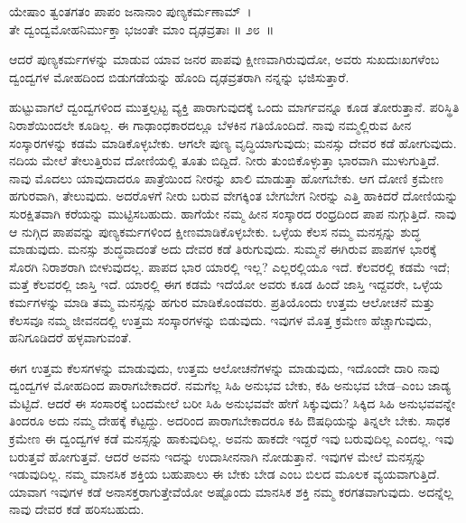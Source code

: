 \begin{shloka}
ಯೇಷಾಂ ತ್ವಂತಗತಂ ಪಾಪಂ ಜನಾನಾಂ ಪುಣ್ಯಕರ್ಮಣಾಮ್~।\\ತೇ ದ್ವಂದ್ವಮೋಹನಿರ್ಮುಕ್ತಾ ಭಜಂತೇ ಮಾಂ ದೃಢವ್ರತಾಃ \hfill॥ ೨೮~॥
\end{shloka}

\begin{artha}
ಆದರೆ ಪುಣ್ಯಕರ್ಮಗಳನ್ನು ಮಾಡುವ ಯಾವ ಜನರ ಪಾಪವು ಕ್ಷೀಣವಾಗಿರುವುದೋ, ಅವರು ಸುಖದುಃಖಗಳೆಂಬ ದ್ವಂದ್ವಗಳ ಮೋಹದಿಂದ ಬಿಡುಗಡೆಯನ್ನು ಹೊಂದಿ ದೃಢವ್ರತರಾಗಿ ನನ್ನನ್ನು ಭಜಿಸುತ್ತಾರೆ.
\end{artha}

ಹುಟ್ಟುವಾಗಲೆ ದ್ವಂದ್ವಗಳಿಂದ ಮುತ್ತಲ್ಪಟ್ಟ ವ್ಯಕ್ತಿ ಪಾರಾಗುವುದಕ್ಕೆ ಒಂದು ಮಾರ್ಗವನ್ನೂ ಕೂಡ ತೋರುತ್ತಾನೆ. ಪರಿಸ್ಥಿತಿ ನಿರಾಶೆಯಿಂದಲೇ ಕೂಡಿಲ್ಲ. ಈ ಗಾಢಾಂಧಕಾರದಲ್ಲೂ ಬೆಳಕಿನ ಗತಿಯೊಂದಿದೆ. ನಾವು ನಮ್ಮಲ್ಲಿರುವ ಹೀನ ಸಂಸ್ಕಾರಗಳನ್ನು ಕಡಮೆ ಮಾಡಿಕೊಳ್ಳಬೇಕು. ಆಗಲೇ ಪುಣ್ಯ ವೃದ್ಧಿಯಾಗುವುದು; ಮನಸ್ಸು ದೇವರ ಕಡೆ ಹೋಗುವುದು. ನದಿಯ ಮೇಲೆ ತೇಲುತ್ತಿರುವ ದೋಣಿಯಲ್ಲಿ ತೂತು ಬಿದ್ದಿದೆ. ನೀರು ತುಂಬಿಕೊಳ್ಳುತ್ತಾ ಭಾರವಾಗಿ ಮುಳುಗುತ್ತಿದೆ. ನಾವು ಮೊದಲು ಯಾವುದಾದರೂ ಪಾತ್ರೆಯಿಂದ ನೀರನ್ನು ಖಾಲಿ ಮಾಡುತ್ತಾ ಹೋಗಬೇಕು. ಆಗ ದೋಣಿ ಕ್ರಮೇಣ ಹಗುರವಾಗಿ, ತೇಲುವುದು. ಅದರೊಳಗೆ ನೀರು ಬರುವ ವೇಗಕ್ಕಿಂತ ಬೇಗಬೇಗ ನೀರನ್ನು ಎತ್ತಿ ಹಾಕಿದರೆ ದೋಣಿಯನ್ನು ಸುರಕ್ಷಿತವಾಗಿ ಕರೆಯನ್ನು ಮುಟ್ಟಿಸಬಹುದು. ಹಾಗೆಯೇ ನಮ್ಮ ಹೀನ ಸಂಸ್ಕಾರದ ರಂಧ್ರದಿಂದ ಪಾಪ ನುಗ್ಗುತ್ತಿದೆ. ನಾವು ಆ ನುಗ್ಗಿದ ಪಾಪವನ್ನು ಪುಣ್ಯಕರ್ಮಗಳಿಂದ ಕ್ಷೀಣಮಾಡಿಕೊಳ್ಳಬೇಕು. ಒಳ್ಳೆಯ ಕೆಲಸ ನಮ್ಮ ಮನಸ್ಸನ್ನು ಶುದ್ಧ ಮಾಡುವುದು. ಮನಸ್ಸು ಶುದ್ಧವಾದಂತೆ ಅದು ದೇವರ ಕಡೆ ತಿರುಗುವುದು. ಸುಮ್ಮನೆ ಈಗಿರುವ ಪಾಪಗಳ ಭಾರಕ್ಕೆ ಸೊರಗಿ ನಿರಾಶರಾಗಿ ಬೀಳುವುದಲ್ಲ. ಪಾಪದ ಭಾರ ಯಾರಲ್ಲಿ ಇಲ್ಲ? ಎಲ್ಲರಲ್ಲಿಯೂ ಇದೆ. ಕೆಲವರಲ್ಲಿ ಕಡಮೆ ಇದೆ; ಮತ್ತೆ ಕೆಲವರಲ್ಲಿ ಜಾಸ್ತಿ ಇದೆ. ಯಾರಲ್ಲಿ ಈಗ ಕಡಮೆ ಇದೆಯೋ ಅವರು ಕೂಡ ಹಿಂದೆ ಜಾಸ್ತಿ ಇದ್ದವರೇ, ಒಳ್ಳೆಯ ಕರ್ಮಗಳನ್ನು ಮಾಡಿ ತಮ್ಮ ಮನಸ್ಸನ್ನು ಹಗುರ ಮಾಡಿಕೊಂಡವರು. ಪ್ರತಿಯೊಂದು ಉತ್ತಮ ಆಲೋಚನೆ ಮತ್ತು ಕೆಲಸವೂ ನಮ್ಮ ಜೀವನದಲ್ಲಿ ಉತ್ತಮ ಸಂಸ್ಕಾರಗಳನ್ನು ಬಿಡುವುದು. ಇವುಗಳ ಮೊತ್ತ ಕ್ರಮೇಣ ಹೆಚ್ಚಾಗುವುದು, ಹನಿಗೂಡಿದರೆ ಹಳ್ಳವಾಗುವಂತೆ.

ಈಗ ಉತ್ತಮ ಕೆಲಸಗಳನ್ನು ಮಾಡುವುದು, ಉತ್ತಮ ಆಲೋಚನೆಗಳನ್ನು ಮಾಡುವುದು, ಇದೊಂದೇ ದಾರಿ ನಾವು ದ್ವಂದ್ವಗಳ ಮೋಹದಿಂದ ಪಾರಾಗಬೇಕಾದರೆ. ನಮಗೆಲ್ಲ ಸಿಹಿ ಅನುಭವ ಬೇಕು, ಕಹಿ ಅನುಭವ ಬೇಡ–ಎಂಬ ಜಾಡ್ಯ ಮೆಟ್ಟಿದೆ. ಆದರೆ ಈ ಸಂಸಾರಕ್ಕೆ ಬಂದಮೇಲೆ ಬರೀ ಸಿಹಿ ಅನುಭವವೇ ಹೇಗೆ ಸಿಕ್ಕುವುದು? ಸಿಕ್ಕಿದ ಸಿಹಿ ಅನುಭವವನ್ನೇ ತಿಂದರೂ ಅದು ನಮ್ಮ ದೇಹಕ್ಕೆ ಕೆಟ್ಟದ್ದು. ಅದರಿಂದ ಪಾರಾಗಬೇಕಾದರೂ ಕಹಿ ಔಷಧಿಯನ್ನು ತಿನ್ನಲೇ ಬೇಕು. ಸಾಧಕ ಕ್ರಮೇಣ ಈ ದ್ವಂದ್ವಗಳ ಕಡೆ ಮನಸ್ಸನ್ನು ಹಾಕುವುದಿಲ್ಲ. ಅವನು ಹಾಕದೇ ಇದ್ದರೆ ಇವು ಬರುವುದಿಲ್ಲ ಎಂದಲ್ಲ. ಇವು ಬರುತ್ತವೆ ಹೋಗುತ್ತವೆ. ಆದರೆ ಅವನು ಇದನ್ನು ಉದಾಸೀನನಾಗಿ ನೋಡುತ್ತಾನೆ. ಇವುಗಳ ಮೇಲೆ ಮನಸ್ಸನ್ನು ಇಡುವುದಿಲ್ಲ. ನಮ್ಮ ಮಾನಸಿಕ ಶಕ್ತಿಯ ಬಹುಪಾಲು ಈ ಬೇಕು ಬೇಡ ಎಂಬ ಬಿಲದ ಮೂಲಕ ವ್ಯಯವಾಗುತ್ತಿದೆ. ಯಾವಾಗ ಇವುಗಳ ಕಡೆ ಅನಾಸಕ್ತರಾಗುತ್ತೇವೆಯೋ ಅಷ್ಟೊಂದು ಮಾನಸಿಕ ಶಕ್ತಿ ನಮ್ಮ ಕರಗತವಾಗುವುದು. ಅದನ್ನೆಲ್ಲ ನಾವು ದೇವರ ಕಡೆ ಹರಿಸಬಹುದು.

